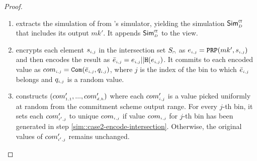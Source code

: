 \begin{proof}
\begin{enumerate}
%
 \item extracts the simulation of \ct from \ct's simulator, yielding  the simulation $\mathsf{Sim}^{\scriptscriptstyle \mathtt{CT}}_{\scriptscriptstyle D}$ that includes its output $mk'$. It appends $\mathsf{Sim}^{\scriptscriptstyle \mathtt{CT}}_{\scriptscriptstyle D}$ to the view. 
 
%
 
 \item\label{sim::case2-encode-intersection} encrypts each element $s_{\scriptscriptstyle i,j}$ in the intersection set $S_{\scriptscriptstyle \cap}$  as $e_{\scriptscriptstyle i,j}=\mathtt{PRP}(mk', s_{\scriptscriptstyle i,j})$ and then encodes the result as $\bar{e}_{\scriptscriptstyle i,j} = e_{\scriptscriptstyle i,j}||\mathtt{H}(e_{\scriptscriptstyle i, j})$. It commits to each encoded value as $com_{\scriptscriptstyle i,j}=\mathtt{Com}(\bar{e}_{\scriptscriptstyle i,j}, q_{\scriptscriptstyle i,j})$, where $j$ is the index of the bin to which $\bar{e}_{\scriptscriptstyle i,j}$ belongs and  $q_{\scriptscriptstyle i, j}$ is a random value. 
 
 
 
  \item\label{sim::case2-gen-commitments} constructs $(com'_{\scriptscriptstyle 1,1}, ..., com'_{\scriptscriptstyle d, h})$ where each $com'_{\scriptscriptstyle i, j}$ is a value picked uniformly at random from the commitment scheme output range. For every $j$-th bin, it sets each  $com'_{\scriptscriptstyle i', j}$ to unique $com_{\scriptscriptstyle i,j}$ if value $com_{\scriptscriptstyle i,j}$ for $j$-th bin has been generated in step \ref{sim::case2-encode-intersection}. Otherwise, the original values of $com'_{\scriptscriptstyle i', j}$ remains unchanged. 
 
 
 
 
 
% 
%
 

\end{enumerate}
\end{proof}
